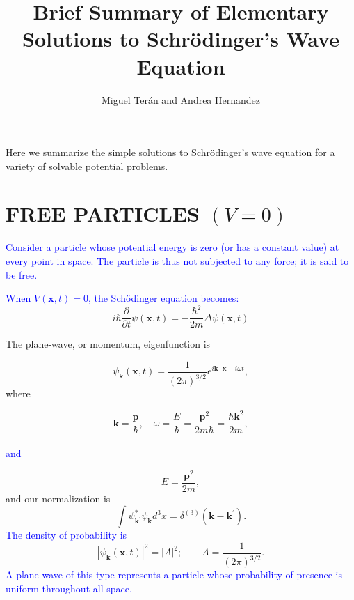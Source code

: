 \documentclass{article}
\title{Brief Summary of Elementary Solutions to Schrödinger's Wave Equation}
\author{Miguel Terán and Andrea Hernandez}
\begin{document}
\maketitle

Here we summarize the simple solutions to Schrödinger's wave equation for a variety of solvable potential problems.

\section{FREE PARTICLES $(V=0)$}

\textcolor{blue}{Consider a particle whose potential energy is zero (or has a constant value) at every point in space. The particle is thus not subjected to any force; it is said to be free.}

\textcolor{blue}{When $V(\textbf{x},t)=0$, the Schödinger equation becomes:}
\begin{equation}
    i \hbar \frac{\partial}{\partial t} \psi(\mathbf{x}, t)=-\frac{\hbar^{2}}{2 m} \Delta \psi(\mathbf{x}, t)
    \label{eq1}
\end{equation}


The plane-wave, or momentum, eigenfunction is

\begin{equation}
\psi_{\mathbf{k}}(\mathbf{x}, t)=\frac{1}{(2 \pi)^{3 / 2}} e^{i \mathbf{k} \cdot \mathbf{x}-i \omega t},
\label{eq2}
\end{equation}
where

\begin{equation}
\mathbf{k}=\frac{\mathbf{p}}{\hbar}, \quad \omega=\frac{E}{\hbar}=\frac{\mathbf{p}^{2}}{2 m \hbar}=\frac{\hbar \mathbf{k}^{2}}{2 m},
\label{eq3}
\end{equation}
\\
\textcolor{blue}{and}

\begin{equation}
    E = \frac{\textbf{p}^2}{2m},
\end{equation}
and our normalization is
\begin{equation}
\int \psi_{\mathbf{k}^{\prime}}^{*} \psi_{\mathbf{k}} d^{3} x=\delta^{(3)}\left(\mathbf{k}-\mathbf{k}^{\prime}\right).
\end{equation}
\textcolor{blue}{The density of probability is}
\begin{equation}
    |\psi_{\textbf{k}}(\mathbf{x}, t)|^{2}=|A|^{2}; \qquad A = \frac{1}{(2 \pi)^{3 / 2}}.
\end{equation}
\textcolor{blue}{A plane wave of this type represents a particle whose probability of presence is uniform throughout all space.}
\\
\end{document}
